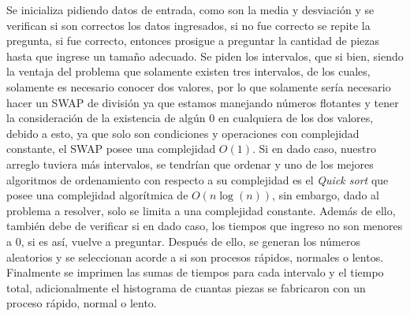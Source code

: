 \documentclass{article}
\begin{document}
Se inicializa pidiendo datos de entrada, como son la media y desviación y se verifican si son correctos los datos ingresados, si no fue correcto se repite la pregunta, si fue correcto, entonces prosigue a preguntar la cantidad de piezas hasta que ingrese un tamaño adecuado. Se piden los intervalos, que si bien, siendo la ventaja del problema que solamente existen tres intervalos, de los cuales, solamente es necesario conocer dos valores, por lo que solamente sería necesario hacer un SWAP de división ya que estamos manejando números flotantes y tener la consideración de la existencia de algún 0 en cualquiera de los dos valores, debido a esto, ya que solo son condiciones y operaciones con complejidad constante, el SWAP posee una complejidad \(O(1)\). Si en dado caso, nuestro arreglo tuviera más intervalos, se tendrían que ordenar y uno de los mejores algoritmos de ordenamiento con respecto a su complejidad es el  \textit{Quick sort} que posee una complejidad algorítmica de $O(n\log(n))$, sin embargo, dado al problema a resolver, solo se limita a una complejidad constante.
Además de ello, también debe de verificar si en dado caso, los tiempos que ingreso no son menores a 0, si es así, vuelve a preguntar.
Después de ello, se generan los números aleatorios y se seleccionan acorde a si son procesos rápidos, normales o lentos.
Finalmente se imprimen las sumas de tiempos para cada intervalo y el tiempo total, adicionalmente el histograma de cuantas piezas se fabricaron con un proceso rápido, normal o lento.
\end{document}
